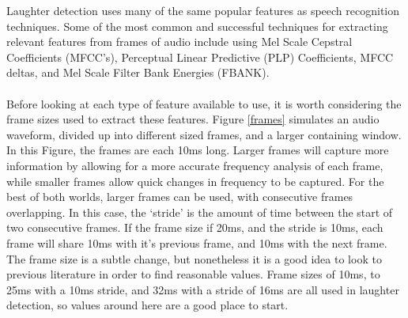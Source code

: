 \documentclass[a4paper,11pt,notitlepage]{article}
\begin{document}
Laughter detection uses many of the same popular features as speech recognition techniques. Some of the most common and successful techniques for extracting relevant features from frames of audio include using Mel Scale Cepstral Coefficients (MFCC’s)\cite{knox2007automatic,truong2005automatic}, Perceptual Linear Predictive (PLP) Coefficients\cite{hermansky1990perceptual}, MFCC deltas, and Mel Scale Filter Bank Energies (FBANK)\cite{gosztolya2016laughter}.\\
\\
Before looking at each type of feature available to use, it is worth considering the frame sizes used to extract these features. Figure \ref{frames} simulates an audio waveform, divided up into different sized frames, and a larger containing window. In this Figure, the frames are each 10ms long. Larger frames will capture more information by allowing for a more accurate frequency analysis of each frame, while smaller frames allow quick changes in frequency to be captured. For the best of both worlds, larger frames can be used, with consecutive frames overlapping. In this case, the `stride' is the amount of time between the start of two consecutive frames. If the frame size if 20ms, and the stride is 10ms, each frame will share 10ms with it's previous frame, and 10ms with the next frame. The frame size is a subtle change, but nonetheless it is a good idea to look to previous literature in order to find reasonable values. Frame sizes of 10ms\cite{kwon2003emotion}, to 25ms with a 10ms stride\cite{knox2007automatic}, and 32ms with a stride of 16ms\cite{truong2007automatic} are all used in laughter detection, so values around here are a good place to start.
\end{document}
